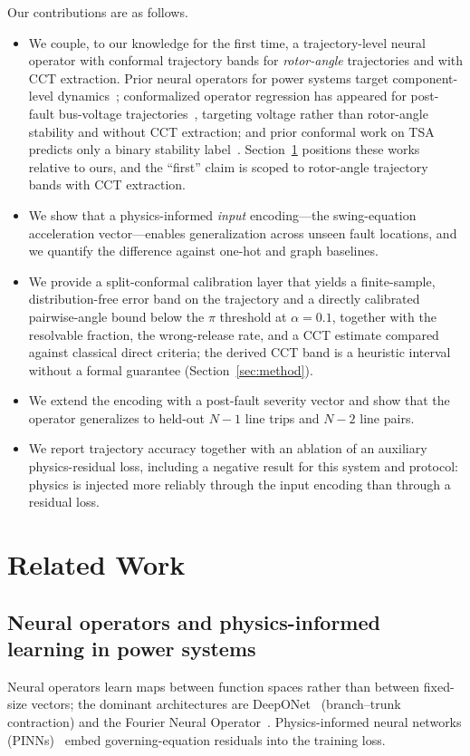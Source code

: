 \documentclass[5p,times]{elsarticle}
\begin{document}
Our contributions are as follows.
\begin{itemize}
\item We couple, to our knowledge for the first time, a trajectory-level neural operator with
conformal trajectory bands for \emph{rotor-angle} trajectories and with CCT extraction. Prior
neural operators for power systems target component-level dynamics~\cite{karampinis2025neural};
conformalized operator regression has appeared for post-fault bus-voltage
trajectories~\cite{mollaali2025conformalized}, targeting voltage rather than rotor-angle stability
and without CCT extraction; and prior conformal work on TSA predicts only a binary stability
label~\cite{lu2026confidence}. Section~\ref{sec:related} positions these works relative to
ours, and the ``first'' claim is scoped to rotor-angle trajectory bands with CCT extraction.
\item We show that a physics-informed \emph{input} encoding---the swing-equation acceleration
vector---enables generalization across unseen fault locations, and we quantify the difference
against one-hot and graph baselines.
\item We provide a split-conformal calibration layer that yields a finite-sample,
distribution-free error band on the trajectory and a directly calibrated pairwise-angle bound
below the $\pi$ threshold at $\alpha{=}0.1$, together with the resolvable fraction, the
wrong-release rate, and a CCT estimate compared against classical direct criteria; the derived
CCT band is a heuristic interval without a formal guarantee (Section~\ref{sec:method}).
\item We extend the encoding with a post-fault severity vector and show that the operator
generalizes to held-out $N{-}1$ line trips and $N{-}2$ line pairs.
\item We report trajectory accuracy together with an ablation of an auxiliary physics-residual
loss, including a negative result for this system and protocol: physics is injected more reliably
through the input encoding than through a residual loss.
\end{itemize}

\section{Related Work}
\label{sec:related}

\subsection{Neural operators and physics-informed learning in power systems}
Neural operators learn maps between function spaces rather than between fixed-size vectors; the
dominant architectures are DeepONet~\cite{lu2021learning} (branch--trunk contraction) and the
Fourier Neural Operator~\cite{li2021fourier}. Physics-informed neural networks
(PINNs)~\cite{raissi2019physics} embed governing-equation residuals into the training loss.
\end{document}
